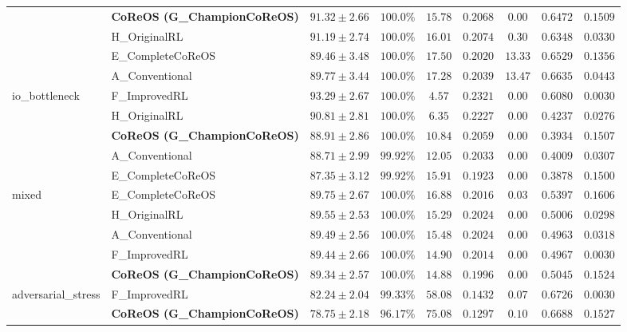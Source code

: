 \documentclass[conference]{IEEEtran}
\begin{document}
\begin{table}[!t]
\begin{tabularx}{\textwidth}{llccccccX}
& \textbf{CoReOS (G\_ChampionCoReOS)} & $91.32 \pm 2.66$ & $100.0\%$ & $15.78$ & $0.2068$ & $\mathbf{0.00}$ & $0.6472$ & $0.1509$ \\
& H\_OriginalRL & $91.19 \pm 2.74$ & $100.0\%$ & $16.01$ & $0.2074$ & $0.30$ & $0.6348$ & $0.0330$ \\
& E\_CompleteCoReOS & $89.46 \pm 3.48$ & $100.0\%$ & $17.50$ & $0.2020$ & $13.33$ & $0.6529$ & $0.1356$ \\
& A\_Conventional & $89.77 \pm 3.44$ & $100.0\%$ & $17.28$ & $0.2039$ & $13.47$ & $0.6635$ & $0.0443$ \\
\midrule
\multirow{5}{*}{io\_bottleneck} & F\_ImprovedRL & $\mathbf{93.29 \pm 2.67}$ & $100.0\%$ & $\mathbf{4.57}$ & $\mathbf{0.2321}$ & $\mathbf{0.00}$ & $\mathbf{0.6080}$ & $0.0030$ \\
& H\_OriginalRL & $90.81 \pm 2.81$ & $100.0\%$ & $6.35$ & $0.2227$ & $\mathbf{0.00}$ & $0.4237$ & $0.0276$ \\
& \textbf{CoReOS (G\_ChampionCoReOS)} & $88.91 \pm 2.86$ & $100.0\%$ & $10.84$ & $0.2059$ & $\mathbf{0.00}$ & $0.3934$ & $0.1507$ \\
& A\_Conventional & $88.71 \pm 2.99$ & $99.92\%$ & $12.05$ & $0.2033$ & $\mathbf{0.00}$ & $0.4009$ & $0.0307$ \\
& E\_CompleteCoReOS & $87.35 \pm 3.12$ & $99.92\%$ & $15.91$ & $0.1923$ & $\mathbf{0.00}$ & $0.3878$ & $0.1500$ \\
\midrule
\multirow{5}{*}{mixed} & E\_CompleteCoReOS & $\mathbf{89.75 \pm 2.67}$ & $100.0\%$ & $16.88$ & $0.2016$ & $0.03$ & $\mathbf{0.5397}$ & $0.1606$ \\
& H\_OriginalRL & $89.55 \pm 2.53$ & $100.0\%$ & $15.29$ & $\mathbf{0.2024}$ & $\mathbf{0.00}$ & $0.5006$ & $0.0298$ \\
& A\_Conventional & $89.49 \pm 2.56$ & $100.0\%$ & $15.48$ & $\mathbf{0.2024}$ & $\mathbf{0.00}$ & $0.4963$ & $0.0318$ \\
& F\_ImprovedRL & $89.44 \pm 2.66$ & $100.0\%$ & $\mathbf{14.90}$ & $0.2014$ & $\mathbf{0.00}$ & $0.4967$ & $0.0030$ \\
& \textbf{CoReOS (G\_ChampionCoReOS)} & $89.34 \pm 2.57$ & $100.0\%$ & $\mathbf{14.88}$ & $0.1996$ & $\mathbf{0.00}$ & $0.5045$ & $0.1524$ \\
\midrule
\multirow{5}{*}{adversarial\_stress} & F\_ImprovedRL & $\mathbf{82.24 \pm 2.04}$ & $\mathbf{99.33\%}$ & $\mathbf{58.08}$ & $\mathbf{0.1432}$ & $\mathbf{0.07}$ & $0.6726$ & $0.0030$ \\
& \textbf{CoReOS (G\_ChampionCoReOS)} & $78.75 \pm 2.18$ & $96.17\%$ & $75.08$ & $0.1297$ & $0.10$ & $0.6688$ & $0.1527$ \\

\end{tabularx}
\end{table}
\end{document}
